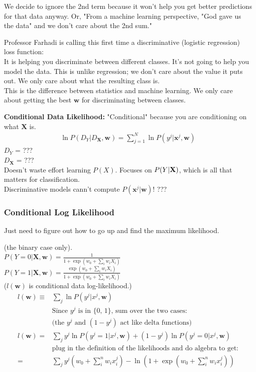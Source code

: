 We decide to ignore the 2nd term because it won't help you get better predictions for that data anyway. 
Or, "From a machine learning perspective, "God gave us the data" and we don't care about the 2nd sum."  %

Professor Farhadi is calling this first time a discriminative (logistic regression) loss function:  \hfill \\
It is helping you discriminate between different classes.  It's not going to help you model the data. 
This is unlike regression; we don't care about the value it puts out.  We only care about what the resulting class is.  \hfill \\

This is the difference between statistics and machine learning.  We only care about getting the best $\bm{w}$ for discriminating between classes. 

\textbf{Conditional Data Likelihood:} 
"Conditional" because you are conditioning on what $\bm{X}$ is. 
\begin{align*}
	\ln P(D_Y | D_{\bm{X}}, \bm{w}) = \sum_{j=1}^N \ln P(y^j | \bm{x}^j, \bm{w})
\end{align*}
$D_Y$ = ???  \hfill \\
$D_{\bm{X}}$ = ???   \hfill \\
Doesn't waste effort learning $P(X)$.  Focuses on $P(Y| \bf{X})$, which is all that matters for classification. \hfill \\
Discriminative models cann't compute $P(\bm{x}^j | \bm{w})$!  ??? 
\hfill \\

\subsubsection{Conditional Log Likelihood}
Just need to figure out how to go up and find the maximum likelihood. 

(the binary case only).  \hfill \\
$P(Y=0 | \bm{X}, \bm{w}) = \frac{1}{1 + \exp(w_0 + \sum_i w_i X_i)}$  \hfill \\
$P(Y=1 | \bm{X}, \bm{w}) = \frac{\exp(w_0 + \sum_i w_i X_i)}{1 + \exp(w_0 + \sum_i w_i X_i)}$  \hfill \\

($ l( \bm{w} )$ is conditional data log-likelihood.)  
\begin{align*}
	l( \bm{w})  \equiv  &  \sum_j \ln P(y^j | x^j, \bm{w})  \\
	& \mbox{Since $y^j$ is in \{0, 1\}, sum over the two cases: }   \\
	& \mbox{(the $y^j$ and $(1-y^j)$ act like delta functions)}   \\
	l(\bm{w})  =  & \sum_j y^j \ln P(y^j = 1 | x^j, \bm{w}) +(1 - y^j) \ln P(y^j = 0 | x^j, \bm{w})  \\
	& \mbox{plug in the definition of the likelihoods and do algebra to get:}  \\
	=& \sum_j  y^j (w_0 + \sum_i^n w_i x_i^j)  - \ln(1 + \exp(w_0 + \sum_i^n w_i x_i^j)) 
\end{align*}	

